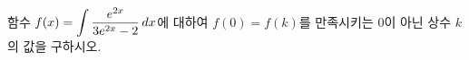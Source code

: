 함수 $f(x)=\displaystyle\int\dfrac{e^{2x}}{3e^{2x}-2}\mkern3mu dx$에 대하여 $f(0)=f(k)$를 만족시키는 $0$이 아닌 상수 $k$의 값을 구하시오.
